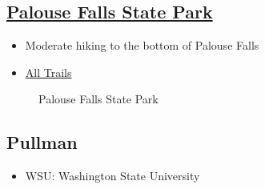 \documentclass{article}
\newcommand{\PalouseFallsStatePark}{\href{https://maps.app.goo.gl/9GDtt9Re3oMoWs216}{Palouse Falls State Park}}
\begin{document}
\subsection{\PalouseFallsStatePark}
\begin{itemize}
  \item{Moderate hiking to the bottom of Palouse Falls}
  \item{\href{https://www.alltrails.com/parks/us/washington/palouse-falls-state-park}{All Trails}}
\end{itemize}
  \begin{figure}[H]
    \centering
    \caption{Palouse Falls State Park}
  \end{figure}

\subsection{Pullman}
\begin{itemize}
  \item{WSU: Washington State University}
\end{itemize}
\end{document}
